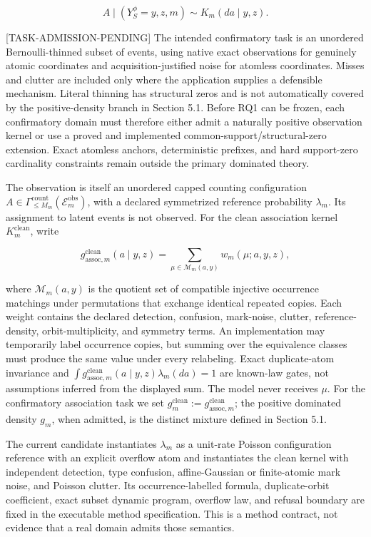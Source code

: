 \documentclass[11pt]{article}
\newcommand{\status}[1]{%
  \textcolor{statusred}{\textbf{\texttt{[#1]}}}%
}
\newcommand{\supportingfile}[2]{%
  \emph{#1} (\nolinkurl{#2})%
}
\def\status#1{[#1]}%
\def\supportingfile#1#2{#1}%
\begin{document}
\[
A\mid(Y_S^\phi=y,z,m)\sim K_m(da\mid y,z).
\]

\status{TASK-ADMISSION-PENDING} The intended confirmatory task is an unordered Bernoulli-thinned subset of events, using native exact observations for genuinely atomic coordinates and acquisition-justified noise for atomless coordinates. Misses and clutter are included only where the application supplies a defensible mechanism. Literal thinning has structural zeros and is not automatically covered by the positive-density branch in Section 5.1. Before RQ1 can be frozen, each confirmatory domain must therefore either admit a naturally positive observation kernel or use a proved and implemented common-support/\allowbreak{}structural-zero extension. Exact atomless anchors, deterministic prefixes, and hard support-zero cardinality constraints remain outside the primary dominated theory.

The observation is itself an unordered capped counting configuration \(A\in\Gamma_{\le M_m}^{\mathrm{count}}(\mathcal E_m^{\mathrm{obs}})\), with a declared symmetrized reference probability \(\lambda_m\). Its assignment to latent events is not observed. For the clean association kernel \(K_m^{\mathrm{clean}}\), write

\[
g_{\mathrm{assoc},m}^{\mathrm{clean}}(a\mid y,z)
=\sum_{\mu\in\mathcal M_m(a,y)}w_m(\mu;a,y,z),
\]

where \(\mathcal M_m(a,y)\) is the quotient set of compatible injective occurrence matchings under permutations that exchange identical repeated copies. Each weight contains the declared detection, confusion, mark-noise, clutter, reference-density, orbit-multiplicity, and symmetry terms. An implementation may temporarily label occurrence copies, but summing over the equivalence classes must produce the same value under every relabeling. Exact duplicate-atom invariance and \(\int g_{\mathrm{assoc},m}^{\mathrm{clean}}(a\mid y,z)\lambda_m(da)=1\) are known-law gates, not assumptions inferred from the displayed sum. The model never receives \(\mu\). For the confirmatory association task we set \(g_m^{\mathrm{clean}}:=g_{\mathrm{assoc},m}^{\mathrm{clean}}\); the positive dominated density \(g_m\), when admitted, is the distinct mixture defined in Section 5.1.

The current candidate instantiates \(\lambda_m\) as a unit-rate Poisson configuration reference with an explicit overflow atom and instantiates the clean kernel with independent detection, type confusion, affine-Gaussian or finite-atomic mark noise, and Poisson clutter. Its occurrence-labelled formula, duplicate-orbit coefficient, exact subset dynamic program, overflow law, and refusal boundary are fixed in the \supportingfile{executable method specification}{executable_method_spec.md}. This is a method contract, not evidence that a real domain admits those semantics.
\end{document}
